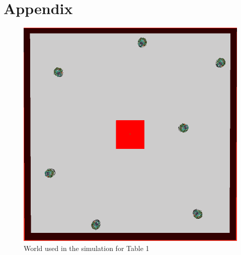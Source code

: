 \documentclass[a4paper]{article}
\begin{document}



\newpage
\part{Appendix}
\begin{figure}[H]
\centering
\includegraphics[scale=0.5]{one-box-world.png}
\caption{World used in the simulation for Table 1}
\end{figure}





\nocite{*}
\end{document}
